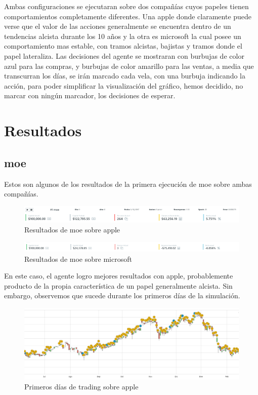 Ambas configuraciones se ejecutaran sobre dos compañías cuyos papeles tienen comportamientos completamente diferentes.
Una apple donde claramente puede verse que el valor de las acciones generalmente se encuentra dentro de un tendencias alcista durante los 10 años y la otra es microsoft la cual posee un comportamiento mas estable, con tramos alcistas, bajistas y tramos donde el papel lateraliza. Las decisiones del agente se mostraran con burbujas de color azul para las compras, y burbujas de color amarillo para las ventas, a media que transcurran los días, se irán marcado cada vela, con una burbuja indicando la acción, para poder simplificar la visualización del gráfico, hemos decidido, no marcar con ningún marcador, los decisiones de esperar.

\section{Resultados}

\subsection{moe}
Estos son algunos de los resultados de la primera ejecución de moe sobre ambas compañías.

\begin{figure}[h!]
	\includegraphics[scale=0.5]{imagenes/moe_appl_ex1_1_summary.png}
	\caption{Resultados de moe sobre apple}
\end{figure}

\begin{figure}[h!]
	\includegraphics[scale=0.45]{imagenes/moe_msft_ex1_1_summary.png}
	\caption{Resultados de moe sobre microsoft}
\end{figure}

En este caso, el agente logro mejores resultados con apple, probablemente producto de la propia característica de un papel generalmente alcista.
Sin embargo, observemos que sucede durante los primeros días de la simulación.

\begin{figure}[h!]
	\includegraphics[scale=0.5]{imagenes/moe_appl_ex1_1.png}
	\caption{Primeros días de trading sobre apple}
\end{figure}

